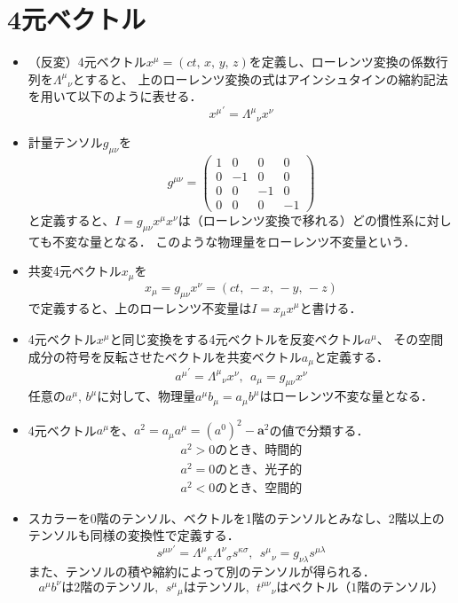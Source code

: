\documentclass[11pt,a4j]{jarticle}
\begin{document}
\section{4元ベクトル}
\begin{itemize}
\item （反変）4元ベクトル$x^{\mu} = (ct, \,x, \,y, \,z)$を定義し、ローレンツ変換の係数行列を${\Lambda^{\mu}}_{\nu}$とすると、
上のローレンツ変換の式はアインシュタインの縮約記法を用いて以下のように表せる．
	\[
		{x^{\mu}}^{\prime} = {\Lambda^{\mu}}_{\nu} x^{\nu}
	\]
\item 計量テンソル$g_{\mu \nu}$を
	\[
		g^{\mu \nu} = 
		\left(
		\begin{array}{cccc}
			1 & 0 & 0 & 0 \\
			0 & -1 & 0 & 0 \\
			0 & 0 & -1 & 0 \\
			0 & 0 & 0 & -1
		\end{array}
	 	\right)
	\]
と定義すると、$I = g_{\mu \nu}x^{\mu}x^{\nu}$は（ローレンツ変換で移れる）どの慣性系に対しても不変な量となる．
このような物理量をローレンツ不変量という．
\item 共変4元ベクトル$x_{\mu}$を
	\[
		x_{\mu} = g_{\mu \nu}x^{\nu} = (ct, \,-x, \,-y, \,-z)
	\]
で定義すると、上のローレンツ不変量は$I = x_{\mu}x^{\mu}$と書ける．
\item 4元ベクトル$x^{\mu}$と同じ変換をする4元ベクトルを反変ベクトル$a^{\mu}$、
その空間成分の符号を反転させたベクトルを共変ベクトル$a_{\mu}$と定義する．
	\[
		{a^{\mu}}^{\prime} = {\Lambda^{\mu}}_{\nu}x^{\nu}, \ \ a_{\mu} = g_{\mu \nu}x^{\nu}
	\]
任意の$a^{\mu}, \,b^{\mu}$に対して、物理量$a^{\mu}b_{\mu} = a_{\mu}b^{\mu}$はローレンツ不変な量となる．
\item 4元ベクトル$a^{\mu}$を、$a^2 = a_{\mu}a^{\mu} = ({a^0})^2 - {\bm{a}}^2$の値で分類する．
	\begin{eqnarray*}
		a^2 > 0 のとき、時間的 \\
		a^2 = 0 のとき、光子的 \\
		a^2 < 0 のとき、空間的
	\end{eqnarray*}
\item スカラーを0階のテンソル、ベクトルを1階のテンソルとみなし、2階以上のテンソルも同様の変換性で定義する．
	\[
		{s^{\mu \nu}}^{\prime} = {\Lambda^{\mu}}_{\kappa}{\Lambda^{\nu}}_{\sigma}s^{\kappa \sigma}, \ \ 
		{s^{\mu}}_{\nu} = g_{\nu \lambda}s^{\mu \lambda}
	\]
また、テンソルの積や縮約によって別のテンソルが得られる．
	\[
		a^{\mu}b^{\nu}は2階のテンソル, \ \ {s^{\mu}}_{\mu}はテンソル, \ \ {t^{\mu \nu}}_{\nu}はベクトル（1階のテンソル）
	\]
\end{itemize}
\end{document}
